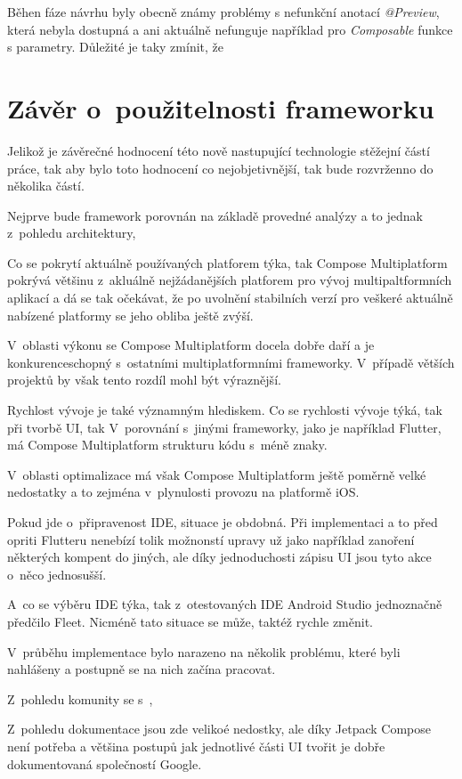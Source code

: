 Běhen fáze návrhu byly obecně známy problémy s nefunkční anotací \textit{@Preview}, která nebyla dostupná a ani aktuálně nefunguje například pro 
\textit{Composable} funkce s parametry. \cite{previewCompose} Důležité je taky zmínit, že 


\section{Závěr o~použitelnosti frameworku}
Jelikož je závěrečné hodnocení této nově nastupující technologie stěžejní částí práce, tak aby bylo toto hodnocení co 
nejobjetivnější, tak bude rozvrženno do několika částí.

Nejprve bude framework porovnán na základě provedné analýzy a to jednak z~pohledu architektury, 

Co se pokrytí aktuálně používaných platforem týka, tak Compose Multiplatform pokrývá většinu z~akluálně nejžádanějších 
platforem pro vývoj multipaltformních aplikací a dá se tak očekávat, že po uvolnění stabilních verzí pro veškeré 
aktuálně nabízené platformy se jeho obliba ještě zvýší. 

V~oblasti výkonu se Compose Multiplatform docela dobře daří a je konkurenceschopný s~ostatními multiplatformními frameworky.
V~případě větších projektů by však tento rozdíl mohl být výraznější.

Rychlost vývoje je také významným hlediskem. 
Co se rychlosti vývoje týká, tak při tvorbě UI, tak V~porovnání s~jinými frameworky, jako je například Flutter, má Compose Multiplatform strukturu kódu s~méně znaky.


V~oblasti optimalizace má však Compose Multiplatform ještě poměrně velké nedostatky a to zejména v~plynulosti provozu na 
platformě iOS.


Pokud jde o~připravenost IDE, situace je obdobná.  Při implementaci a to před
opriti Flutteru nenebízí tolik možnonstí upravy už jako  například zanoření některých kompent do jiných, ale díky jednoduchosti
zápisu UI jsou tyto akce o~něco jednosušší.

A~co se výběru IDE týka, tak z~otestovaných IDE Android Studio jednoznačně předčilo Fleet. Nicméně tato situace se může, 
taktéž rychle změnit.

V~průběhu implementace bylo narazeno na několik problému, které byli nahlášeny a postupně se na nich začína pracovat.

Z~pohledu komunity se s~,


Z~pohledu dokumentace jsou zde velikoé nedostky, ale díky Jetpack Compose není potřeba a většina postupů jak jednotlivé části 
UI tvořit je dobře dokumentovaná společností Google. 

